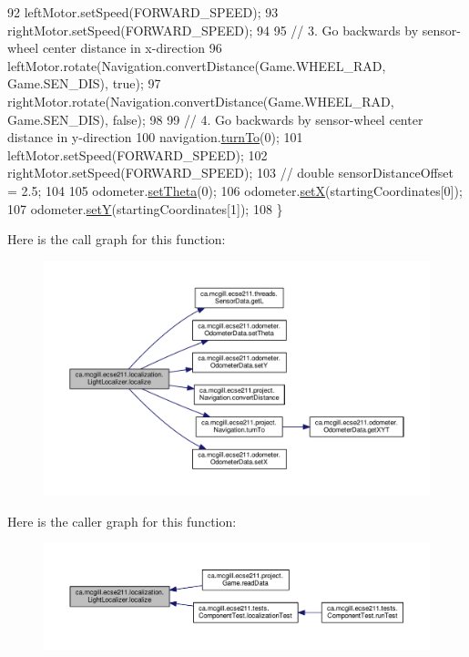 \begin{DoxyCode}
92     leftMotor.setSpeed(FORWARD\_SPEED);
93     rightMotor.setSpeed(FORWARD\_SPEED);
94 
95     \textcolor{comment}{// 3. Go backwards by sensor-wheel center distance in x-direction}
96     leftMotor.rotate(Navigation.convertDistance(Game.WHEEL\_RAD, Game.SEN\_DIS), \textcolor{keyword}{true});
97     rightMotor.rotate(Navigation.convertDistance(Game.WHEEL\_RAD, Game.SEN\_DIS), \textcolor{keyword}{false});
98 
99     \textcolor{comment}{// 4. Go backwards by sensor-wheel center distance in y-direction}
100     navigation.\hyperlink{classca_1_1mcgill_1_1ecse211_1_1project_1_1_navigation_a3bbe0645f2b3b3d0986b4a707fb5a00c}{turnTo}(0);
101     leftMotor.setSpeed(FORWARD\_SPEED);
102     rightMotor.setSpeed(FORWARD\_SPEED);
103     \textcolor{comment}{// double sensorDistanceOffset = 2.5;}
104 
105     odometer.\hyperlink{classca_1_1mcgill_1_1ecse211_1_1odometer_1_1_odometer_data_a419b8f07c2c5374411c8e62298e9a402}{setTheta}(0);
106     odometer.\hyperlink{classca_1_1mcgill_1_1ecse211_1_1odometer_1_1_odometer_data_a2911d7215e47f3064defe016b46bfeef}{setX}(startingCoordinates[0]);
107     odometer.\hyperlink{classca_1_1mcgill_1_1ecse211_1_1odometer_1_1_odometer_data_a82986438cd462e66520bc62bb4bd2b75}{setY}(startingCoordinates[1]);
108   \}
\end{DoxyCode}
Here is the call graph for this function\+:\nopagebreak
\begin{figure}[H]
\begin{center}
\leavevmode
\includegraphics[width=350pt]{classca_1_1mcgill_1_1ecse211_1_1localization_1_1_light_localizer_afb295ca8cd6623ac3e9eacb1d31b75b9_cgraph}
\end{center}
\end{figure}
Here is the caller graph for this function\+:\nopagebreak
\begin{figure}[H]
\begin{center}
\leavevmode
\includegraphics[width=350pt]{classca_1_1mcgill_1_1ecse211_1_1localization_1_1_light_localizer_afb295ca8cd6623ac3e9eacb1d31b75b9_icgraph}
\end{center}
\end{figure}


